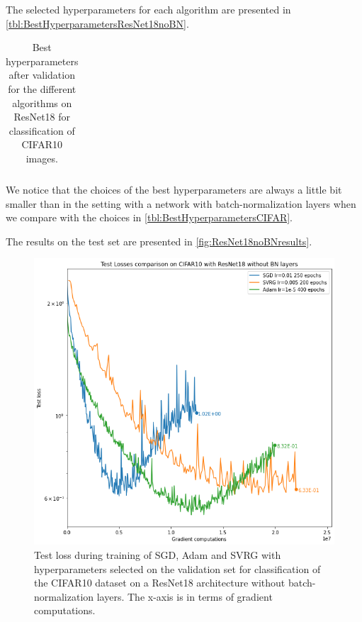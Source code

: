 \documentclass[a4paper,11pt,oneside]{report}
\begin{document}
The selected hyperparameters for each algorithm are presented in \autoref{tbl:BestHyperparametersResNet18noBN}.

\begin{table}
    \begin{center}
        \begin{tabular}{||c | c | l||}
             \hline
             
        \end{tabular}
    \end{center}
    \caption{Best hyperparameters after validation for the different algorithms on ResNet18 for classification of CIFAR10 images.
    }
    \label{tbl:BestHyperparametersResNet18noBN}
\end{table}

We notice that the choices of the best hyperparameters are always a little bit smaller than in the setting with a network with batch-normalization layers when we compare with the choices in \autoref{tbl:BestHyperparametersCIFAR}.

The results on the test set are presented in \autoref{fig:ResNet18noBNresults}.

\begin{figure}
    \centering
    \includegraphics[width=\columnwidth]{figures/ResNet18noBNResults.png}
    \caption{Test loss during training of SGD, Adam and SVRG with hyperparameters selected on the validation set for classification of the CIFAR10 dataset on a ResNet18 architecture without batch-normalization layers. The x-axis is in terms of gradient computations.}
    \label{fig:ResNet18noBNresults}
\end{figure}
\end{document}
